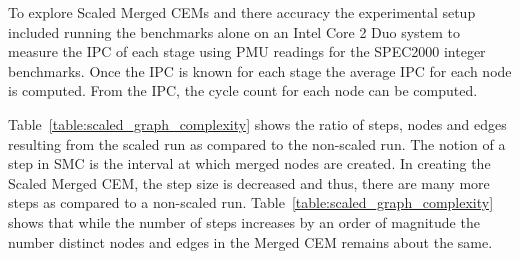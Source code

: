 To explore Scaled Merged CEMs and there accuracy the experimental setup included running the
benchmarks alone on an Intel Core 2 Duo system to measure the IPC of each stage using PMU
readings for the SPEC2000 integer benchmarks. Once the IPC is known for each stage the
average IPC for each node is computed. From the IPC, the cycle count for each node
can be computed.

Table~\ref{table:scaled_graph_complexity}
shows the ratio of steps, nodes and edges resulting from the scaled
run as compared to the non-scaled run. The notion of a step in SMC is the
interval at which merged nodes are created. In creating the Scaled Merged CEM,
the step size is decreased and thus, there are many more steps as compared to a
non-scaled run. Table~\ref{table:scaled_graph_complexity} shows that while the
number of steps increases by an order of magnitude the number distinct
nodes and edges in the Merged CEM remains about the same.

